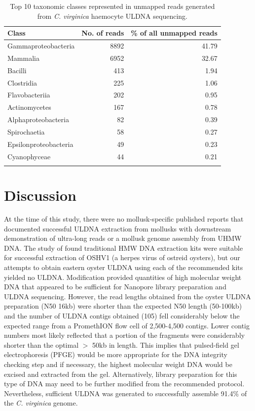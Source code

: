 \documentclass[lineno,referee,pdflatex,sn-basic]{sn-jnl}%
\begin{document}
\begin{table}[ht]
\caption{Top 10 taxonomic classes represented in unmapped reads generated from \textit{C. virginica} haemocyte ULDNA sequencing.}
\label{table:taxonomy}
\begin{tabular}{@{}lrr@{}}
\toprule
Class & No. of reads & \% of all unmapped reads \\
\midrule
Gammaproteobacteria & 8892 & 41.79 \\
Mammalia & 6952 & 32.67 \\
Bacilli & 413 & 1.94 \\
Clostridia & 225 & 1.06 \\
Flavobacteriia & 202 & 0.95 \\
Actinomycetes & 167 & 0.78 \\
Alphaproteobacteria & 82 & 0.39 \\
Spirochaetia & 58 & 0.27 \\
Epsilonproteobacteria & 49 & 0.23 \\
Cyanophyceae & 44 & 0.21 \\
\botrule
\end{tabular}
\end{table}

\section{Discussion}
At the time of this study, there were no mollusk-specific published reports that documented successful ULDNA extraction from mollusks with downstream demonstration of ultra-long reads or a mollusk genome assembly from UHMW DNA. The study of \cite{dotto-maurel_evaluation_2025} found traditional HMW DNA extraction kits were suitable for successful extraction of OSHV1 (a herpes virus of ostreid oysters), but our attempts to obtain eastern oyster ULDNA using each of the recommended kits yielded no ULDNA. Modification \cite{brown_population_1989} provided quantities of high molecular weight DNA that appeared to be sufficient for Nanopore library preparation and ULDNA sequencing. However, the read lengths obtained from the oyster ULDNA preparation (N50 16kb) were shorter than the expected N50 length (50-100kb) and the number of ULDNA contigs obtained (105) fell considerably below the expected range from a PromethION flow cell of 2,500-4,500 contigs. Lower contig numbers most likely reflected that a portion of the fragments were considerably shorter than the optimal $>$ 50kb in length. This implies that pulsed-field gel electrophoresis (PFGE) would be more appropriate for the DNA integrity checking step and if necessary, the highest molecular weight DNA would be excised and extracted from the gel. Alternatively, library preparation for this type of DNA may need to be further modified from the recommended protocol. Nevertheless, sufficient ULDNA was generated to successfully assemble 91.4\% of the \textit{C. virginica} genome.
\end{document}
